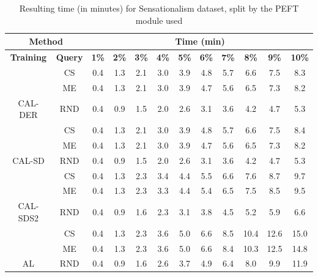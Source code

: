 \begin{table}[htbp]
\begin{subtable}{\linewidth}
\begin{tabular}{c|c|cccccccccc}
\toprule
\multicolumn{2}{c|}{\textbf{Method}} & \multicolumn{10}{c}{\textbf{Time (min)}} \\
\midrule
\textbf{Training} & \textbf{Query} & \textbf{1\%} & \textbf{2\%} & \textbf{3\%} & \textbf{4\%} & \textbf{5\%} & \textbf{6\%} & \textbf{7\%} & \textbf{8\%} & \textbf{9\%} & \textbf{10\%}\\
\midrule
 & CS & 0.4 & 1.3 & 2.1 & 3.0 & 3.9 & 4.8 & 5.7 & 6.6 & 7.5 & 8.3\\

 & ME & 0.4 & 1.3 & 2.1 & 3.0 & 3.9 & 4.7 & 5.6 & 6.5 & 7.3 & 8.2\\

\multirow{-3}{*}{\raggedright\arraybackslash CAL-DER} & RND & 0.4 & 0.9 & 1.5 & 2.0 & 2.6 & 3.1 & 3.6 & 4.2 & 4.7 & 5.3\\
\midrule
 & CS & 0.4 & 1.3 & 2.1 & 3.0 & 3.9 & 4.8 & 5.7 & 6.6 & 7.5 & 8.4\\

 & ME & 0.4 & 1.3 & 2.1 & 3.0 & 3.9 & 4.7 & 5.6 & 6.5 & 7.3 & 8.2\\

\multirow{-3}{*}{\raggedright\arraybackslash CAL-SD} & RND & 0.4 & 0.9 & 1.5 & 2.0 & 2.6 & 3.1 & 3.6 & 4.2 & 4.7 & 5.3\\
\midrule
 & CS & 0.4 & 1.3 & 2.3 & 3.4 & 4.4 & 5.5 & 6.6 & 7.6 & 8.7 & 9.7\\

 & ME & 0.4 & 1.3 & 2.3 & 3.3 & 4.4 & 5.4 & 6.5 & 7.5 & 8.5 & 9.5\\

\multirow{-3}{*}{\raggedright\arraybackslash CAL-SDS2} & RND & 0.4 & 0.9 & 1.6 & 2.3 & 3.1 & 3.8 & 4.5 & 5.2 & 5.9 & 6.6\\
\midrule
 & CS & 0.4 & 1.3 & 2.3 & 3.6 & 5.0 & 6.6 & 8.5 & 10.4 & 12.6 & 15.0\\

 & ME & 0.4 & 1.3 & 2.3 & 3.6 & 5.0 & 6.6 & 8.4 & 10.3 & 12.5 & 14.8\\

\multirow{-3}{*}{\raggedright\arraybackslash AL} & RND & 0.4 & 0.9 & 1.6 & 2.6 & 3.7 & 4.9 & 6.4 & 8.0 & 9.9 & 11.9\\
\bottomrule
\end{tabular}
\end{subtable}
\caption{Resulting time (in minutes) for Sensationalism dataset, split by the PEFT module used}
\label{tab:time_short_sensation_10}
\end{table}
